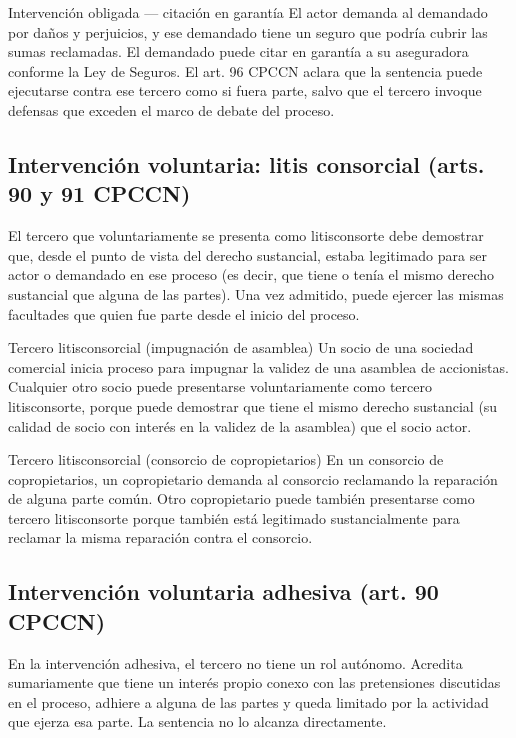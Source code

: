 \documentclass[12pt,oneside]{book}
\begin{document}
\begin{example}{Intervención obligada — citación en garantía}
El actor demanda al demandado por daños y perjuicios, y ese demandado tiene un seguro que podría cubrir las sumas reclamadas. El demandado puede citar en garantía a su aseguradora conforme la Ley de Seguros. El art. 96 CPCCN aclara que la sentencia puede ejecutarse contra ese tercero como si fuera parte, salvo que el tercero invoque defensas que exceden el marco de debate del proceso.
\end{example}

\subsection{Intervención voluntaria: litis consorcial (arts. 90 y 91 CPCCN)}

El tercero que voluntariamente se presenta como litisconsorte debe demostrar que, desde el punto de vista del derecho sustancial, estaba legitimado para ser actor o demandado en ese proceso (es decir, que tiene o tenía el mismo derecho sustancial que alguna de las partes). Una vez admitido, puede ejercer las mismas facultades que quien fue parte desde el inicio del proceso.

\begin{example}{Tercero litisconsorcial (impugnación de asamblea)}
Un socio de una sociedad comercial inicia proceso para impugnar la validez de una asamblea de accionistas. Cualquier otro socio puede presentarse voluntariamente como tercero litisconsorte, porque puede demostrar que tiene el mismo derecho sustancial (su calidad de socio con interés en la validez de la asamblea) que el socio actor.
\end{example}

\begin{example}{Tercero litisconsorcial (consorcio de copropietarios)}
En un consorcio de copropietarios, un copropietario demanda al consorcio reclamando la reparación de alguna parte común. Otro copropietario puede también presentarse como tercero litisconsorte porque también está legitimado sustancialmente para reclamar la misma reparación contra el consorcio.
\end{example}

\subsection{Intervención voluntaria adhesiva (art. 90 CPCCN)}

En la intervención adhesiva, el tercero no tiene un rol autónomo. Acredita sumariamente que tiene un interés propio conexo con las pretensiones discutidas en el proceso, adhiere a alguna de las partes y queda limitado por la actividad que ejerza esa parte. La sentencia no lo alcanza directamente.
\end{document}
